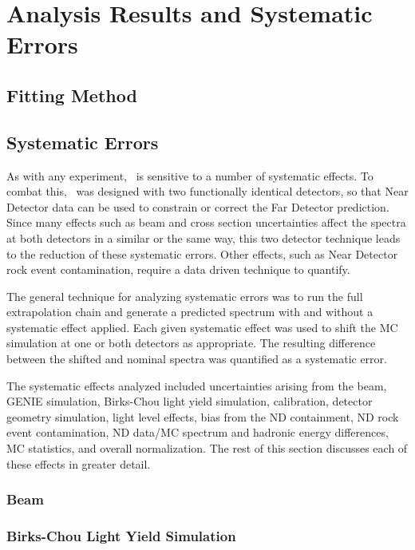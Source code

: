 \chapter{Analysis Results and Systematic Errors}

\section{Fitting Method}

\section{Systematic Errors}

As with any experiment, \nova~is sensitive to a number of systematic effects. To combat this, \nova~was designed with two functionally identical detectors, so that Near Detector data can be used to constrain or correct the Far Detector prediction. Since many effects such as beam and cross section uncertainties affect the spectra at both detectors in a similar or the same way, this two detector technique leads to the reduction of these systematic errors. Other effects, such as Near Detector rock event contamination, require a data driven technique to quantify.

The general technique for analyzing systematic errors was to run the full extrapolation chain and generate a predicted spectrum with and without a systematic effect applied. Each given systematic effect was used to shift the MC simulation at one or both detectors as appropriate. The resulting difference between the shifted and nominal spectra was quantified as a systematic error.

The systematic effects analyzed included uncertainties arising from the beam, GENIE simulation, Birks-Chou light yield simulation, calibration, detector geometry simulation, light level effects, bias from the ND containment, ND rock event contamination, ND data/MC spectrum and hadronic energy differences, MC statistics, and overall normalization. The rest of this section discusses each of these effects in greater detail.

\subsection{Beam}

\subsection{Birks-Chou Light Yield Simulation}

